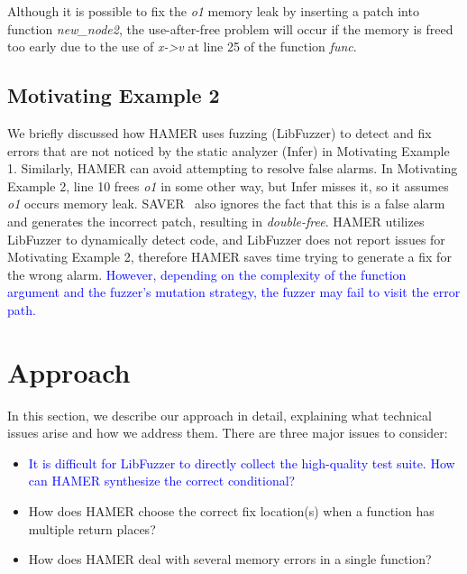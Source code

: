 \documentclass[a4paper,11pt,oneside,openany]{book}
\begin{document}
Although it is possible to fix the  {\it o1} memory leak by inserting a patch into function  {\it new\_node2}, the use-after-free problem will occur if the memory is freed too early due to the use of  {\it x->v} at line 25 of the function  {\it func}.




\section{Motivating Example 2}
We briefly discussed how HAMER uses fuzzing (LibFuzzer) to detect and fix errors that are not noticed by the static analyzer (Infer) in Motivating Example 1. Similarly, HAMER can avoid attempting to resolve false alarms. In Motivating Example 2, line 10 frees {\it o1} in some other way, but Infer misses it, so it assumes {\it o1} occurs memory leak. SAVER~\cite{SAVER} also ignores the fact that this is a false alarm and generates the incorrect patch, resulting in {\it double-free}. HAMER utilizes LibFuzzer to dynamically detect code, and LibFuzzer does not report issues for Motivating Example 2, therefore HAMER saves time trying to generate a fix for the wrong alarm. \textcolor{blue}{However, depending on the complexity of the function argument and the fuzzer's mutation strategy, the fuzzer may fail to visit the error path.}


\chapter{Approach}
\label{approach}
In this section, we describe our approach in detail, explaining what technical issues arise and how we address them. There are three major issues to consider:
\begin{itemize}
\item \textcolor{blue}{It is difficult for LibFuzzer to directly collect the high-quality test suite. How can HAMER synthesize the correct conditional?}
\item How does HAMER choose the correct fix location(s) when a function has multiple return places?
\item How does HAMER deal with several memory errors in a single function?
\end{itemize}
\end{document}
